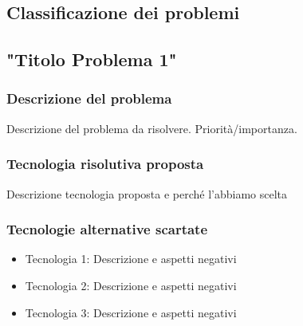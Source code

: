 \documentclass[./../Technology Baseline.tex]{subfiles}
\begin{document}
\subsection{Classificazione dei problemi}

\subsection{"Titolo Problema 1"}

\subsubsection{Descrizione del problema}
Descrizione del problema da risolvere. Priorità/importanza.

\subsubsection{Tecnologia risolutiva proposta}
Descrizione tecnologia proposta e perché l'abbiamo scelta

\subsubsection{Tecnologie alternative scartate}
\begin{itemize}
	\item{Tecnologia 1: } Descrizione e aspetti negativi
	\item{Tecnologia 2: } Descrizione e aspetti negativi
	\item{Tecnologia 3: } Descrizione e aspetti negativi
\end{itemize}
\end{document}
